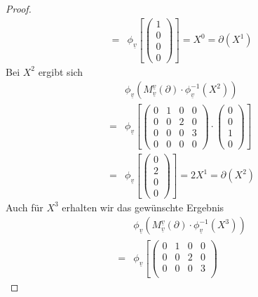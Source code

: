 \documentclass{article}
\begin{document}
\begin{enumerate}[(a)]
\begin{enumerate}[1.)]
\begin{proof}
\begin{align*}
                =&\phi_{\underline{v}}
                    \left[\begin{pmatrix}1 \\ 0 \\ 0 \\ 0\end{pmatrix}\right]
                    = X^0 = \partial(X^1)
            \end{align*}
            Bei $X^2$ ergibt sich
            \begin{align*}
                &\phi_{\underline{v}}(M_{\underline{v}}^{\underline{v}} (\partial) \cdot \phi_{\underline{v}}^{-1}(X^2))\\
                =&\phi_{\underline{v}}
                    \left[
                    \begin{pmatrix}
                        0 & 1 & 0 & 0\\
                        0 & 0 & 2 & 0\\
                        0 & 0 & 0 & 3\\
                        0 & 0 & 0 & 0
                    \end{pmatrix} \cdot 
                    \begin{pmatrix}0 \\ 0 \\ 1 \\ 0\end{pmatrix}
                    \right]\\
                =&\phi_{\underline{v}}
                    \left[\begin{pmatrix}0 \\ 2 \\ 0 \\ 0\end{pmatrix}\right]
                    = 2X^1 = \partial(X^2)
            \end{align*}
            Auch für $X^3$ erhalten wir das gewünschte Ergebnis
            \begin{align*}
                &\phi_{\underline{v}}(M_{\underline{v}}^{\underline{v}} (\partial) \cdot \phi_{\underline{v}}^{-1}(X^3))\\
                =&\phi_{\underline{v}}
                    \left[
                    \begin{pmatrix}
                        0 & 1 & 0 & 0\\
                        0 & 0 & 2 & 0\\
                        0 & 0 & 0 & 3\\

\end{pmatrix}
\end{align*}
\end{proof}
\end{enumerate}
\end{enumerate}
\end{document}
